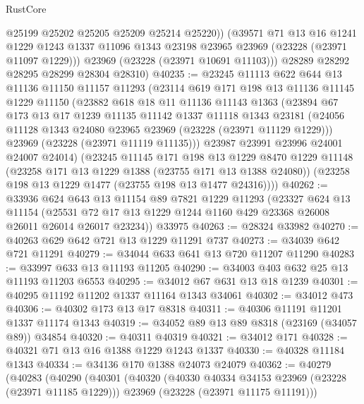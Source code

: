 \begin{lexlean}{RustCore}
\begin{coremodule}
            @25199
            @25202
            @25205
            @25209
            @25214
            @25220))
        (@39571
          @71
          @13
          @16
          @1241
          @1229
          @1243
          @1337
          @11096
          @1343
          @23198
          @23965
          @23969
          (@23228 (@23971 @11097 @1229)))
        @23969
        (@23228 (@23971 @10691 @11103)))
      @28289
      @28292
      @28295
      @28299
      @28304
      @28310)
@40235 := @23245
    @11113
    @622
    @644
    @13
    @11136
    @11150
    @11157
    @11293
    (@23114
      @619
      @171
      @198
      @13
      @11136
      @11145
      @1229
      @11150
      (@23882
        @618
        @18
        @11
        @11136
        @11143
        @1363
        (@23894
          @67
          @173
          @13
          @17
          @1239
          @11135
          @11142
          @1337
          @11118
          @1343
          @23181
          (@24056 @11128 @1343 @24080 @23965 @23969 (@23228 (@23971 @11129 @1229)))
          @23969
          (@23228 (@23971 @11119 @11135)))
        @23987
        @23991
        @23996
        @24001
        @24007
        @24014)
      (@23245
        @11145
        @171
        @198
        @13
        @1229
        @8470
        @1229
        @11148
        (@23258 @171 @13 @1229 @1388 (@23755 @171 @13 @1388 @24080))
        (@23258 @198 @13 @1229 @1477 (@23755 @198 @13 @1477 @24316))))
@40262 := @33936
    @624
    @643
    @13
    @11154
    @89
    @7821
    @1229
    @11293
    (@23327
      @624
      @13
      @11154
      (@25531 @72 @17 @13 @1229 @1244 @1160 @429 @23368 @26008 @26011 @26014 @26017 @23234))
    @33975
@40263 := @28324 @33982
@40270 := @40263 @629 @642 @721 @13 @1229 @11291 @737
@40273 := @34039 @642 @721 @11291
@40279 := @34044 @633 @641 @13 @720 @11207 @11290
@40283 := @33997 @633 @13 @11193 @11205
@40290 := @34003 @403 @632 @25 @13 @11193 @11203 @6553
@40295 := @34012 @67 @631 @13 @18 @1239
@40301 := @40295 @11192 @11202 @1337 @11164 @1343 @34061
@40302 := @34012 @473
@40306 := @40302 @173 @13 @17 @8318
@40311 := @40306 @11191 @11201 @1337 @11174 @1343
@40319 := @34052 @89 @13 @89 @8318 (@23169 (@34057 @89)) @34854
@40320 := @40311 @40319
@40321 := @34012 @171
@40328 := @40321 @71 @13 @16 @1388 @1229 @1243 @1337
@40330 := @40328 @11184 @1343
@40334 := @34136 @170 @1388 @24073 @24079
@40362 := @40279
    (@40283
      (@40290
        (@40301
          (@40320
            (@40330 @40334 @34153 @23969 (@23228 (@23971 @11185 @1229)))
            @23969
            (@23228 (@23971 @11175 @11191)))

\end{coremodule}
\end{lexlean}
